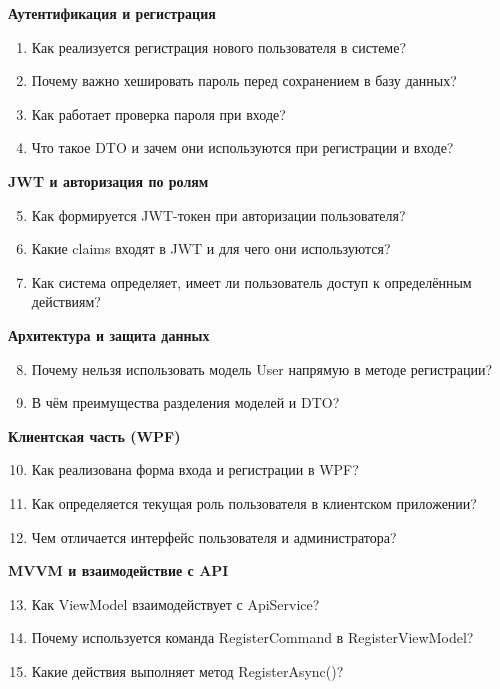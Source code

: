 \documentclass[12pt]{article}
\numberwithin{listing}{section}
\numberwithin{figure}{section}
\begin{document}
\textbf{Аутентификация и регистрация}
\begin{enumerate}
	\item Как реализуется регистрация нового пользователя в системе?
	\item Почему важно хешировать пароль перед сохранением в базу данных?
	\item Как работает проверка пароля при входе?
	\item Что такое DTO и зачем они используются при регистрации и входе?
\end{enumerate}

\noindent \textbf{JWT и авторизация по ролям}
\begin{enumerate}
	\setcounter{enumi}{4} %
	\item Как формируется JWT-токен при авторизации пользователя?
	\item Какие claims входят в JWT и для чего они используются?
	\item Как система определяет, имеет ли пользователь доступ к определённым действиям?
\end{enumerate}

\noindent \textbf{Архитектура и защита данных}
\begin{enumerate}
	\setcounter{enumi}{7}
	\item Почему нельзя использовать модель User напрямую в методе регистрации?
	\item В чём преимущества разделения моделей и DTO?
\end{enumerate}

\noindent \textbf{Клиентская часть (WPF)}
\begin{enumerate}
	\setcounter{enumi}{9}
	\item Как реализована форма входа и регистрации в WPF?
	\item Как определяется текущая роль пользователя в клиентском приложении?
	\item Чем отличается интерфейс пользователя и администратора?
\end{enumerate}

\noindent \textbf{MVVM и взаимодействие с API}
\begin{enumerate}
	\setcounter{enumi}{12}
	\item Как ViewModel взаимодействует с ApiService?
	\item Почему используется команда RegisterCommand в RegisterViewModel?
	\item Какие действия выполняет метод RegisterAsync()?
\end{enumerate}
\end{document}
